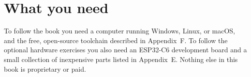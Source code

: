 \section*{What you need}

To follow the book you need a computer running Windows, Linux, or macOS, and the
free, open-source toolchain described in Appendix~F. To follow the optional
hardware exercises you also need an ESP32\nobreakdash-C6 development board and a small
collection of inexpensive parts listed in Appendix~E. Nothing else in this book
is proprietary or paid.
